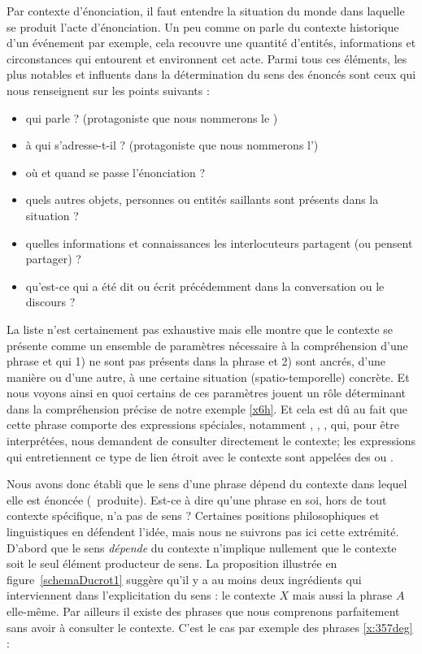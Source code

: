 \begin{refsegment}
Par contexte d'énonciation, il faut entendre la situation du monde dans laquelle se produit l'acte d'énonciation.  Un peu comme on parle du contexte historique d'un événement par exemple, cela recouvre une quantité d'entités, informations et circonstances qui entourent et environnent cet acte.   
Parmi tous ces éléments, les plus notables et influents dans la détermination du sens des énoncés sont ceux qui nous renseignent sur les points suivants :

\begin{itemize}[before*=\raggedright]  
\item qui parle ? (protagoniste que nous nommerons le ) 
\item à qui s'adresse-t-il ? (protagoniste que nous nommerons l')
\item où  et quand se passe l'énonciation ?
\item quels autres objets, personnes ou entités saillants sont présents dans la situation ?
\item quelles informations et connaissances les interlocuteurs partagent (ou pensent partager) ?
\item qu'est-ce qui a été dit ou écrit précédemment dans la conversation ou le discours ?
\end{itemize}

\smallskip

La liste n'est certainement pas exhaustive mais elle montre que le contexte se présente comme un ensemble de paramètres nécessaire à la compréhension d'une phrase et qui 1) ne sont pas présents dans la phrase et 2) sont ancrés, d'une manière ou d'une autre, à une certaine situation (spatio-temporelle) concrète.  Et nous voyons ainsi en quoi certains de ces paramètres jouent un rôle déterminant dans la compréhension précise de notre exemple \ref{x6h}.
Et cela est dû au fait que cette phrase comporte des expressions spéciales, notamment , , , qui, pour être interprétées, nous demandent de consulter directement le contexte; les expressions qui entretiennent ce type de lien étroit avec le contexte sont appelées des  ou .


Nous avons donc établi que le sens d'une phrase dépend du contexte dans lequel elle est énoncée (\ie\ produite).  Est-ce à dire qu'une phrase en soi, hors de tout contexte spécifique, n'a pas de sens ?  Certaines positions philosophiques et linguistiques en défendent l'idée, mais nous ne suivrons pas ici cette extrémité.  D'abord que le sens \emph{dépende} du contexte n'implique nullement que le contexte soit le seul élément producteur de sens.  La proposition illustrée en figure~\ref{schemaDucrot1} suggère qu'il y a au moins deux ingrédients qui interviennent dans l'explicitation du sens : le contexte $X$ mais aussi la phrase $A$ elle-même.  Par ailleurs il existe des phrases que nous comprenons parfaitement sans avoir à consulter le contexte. C'est le cas par exemple des phrases \ref{x:357deg} :



\end{refsegment}
